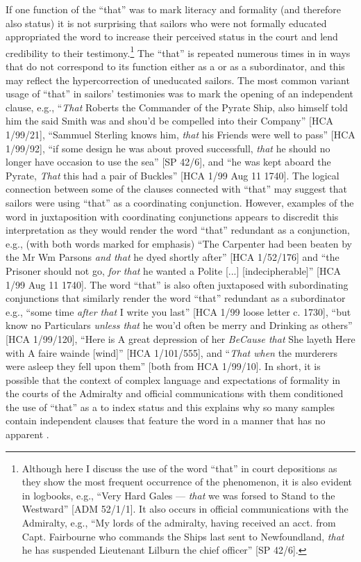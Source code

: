 If one function of the  “that” was to mark literacy and formality (and therefore also status) it is not surprising that sailors who were not formally educated appropriated the word to increase their perceived status in the court and lend credibility to their testimony.\footnote{Although here I discuss the use of the word “that” in court depositions as they show the most frequent occurrence of the phenomenon, it is also evident in logbooks, e.g., “Very Hard Gales — \textit{that} we was forsed to Stand to the Westward” [ADM 52/1/1]. It also occurs in official communications with the Admiralty, e.g., “My lords of the admiralty, having received an acct. from Capt. Fairbourne who commands the Ships last sent to Newfoundland, \textit{that} he has suspended Lieutenant Lilburn the chief officer” [SP 42/6].}   The  “that” is repeated numerous times in  in ways that do not correspond to its function either as a  or as a subordinator, and this may reflect the hypercorrection of uneducated sailors. The most common variant usage of “that” in sailors’ testimonies was to mark the opening of an independent clause, e.g., “\textit{That} Roberts the Commander of the Pyrate Ship, also himself told him the said Smith was and shou’d be compelled into their Company” [HCA 1/99/21], “Sammuel Sterling knows him, \textit{that} his Friends were well to pass” [HCA 1/99/92], “if some design he was about proved successfull, \textit{that} he should no longer have occasion to use the sea” [SP 42/6], and “he was kept aboard the Pyrate, \textit{That} this  had a pair of Buckles” [HCA 1/99  Aug 11 1740]. The logical connection between some of the clauses connected with “that” may suggest that sailors were using “that” as a coordinating conjunction. However, examples of the word in juxtaposition with coordinating conjunctions appears to discredit this interpretation as they would render the word “that” redundant as a conjunction, e.g., (with both words marked for emphasis) “The Carpenter had been beaten by the Mr Wm Parsons \textit{and that} he dyed shortly after” [HCA 1/52/176] and “the Prisoner should not go, \textit{for that} he wanted a Polite [...] [indecipherable]” [HCA 1/99  Aug 11 1740]. The word “that” is also often juxtaposed with subordinating conjunctions that similarly render the word “that” redundant as a subordinator e.g., “some time \textit{after that} I write you last” [HCA 1/99 loose letter c. 1730], “but know no Particulars \textit{unless that} he wou’d often be merry and Drinking as others” [HCA 1/99/120], “Here is A great depression of her \textit{BeCause that} She layeth Here with A faire wainde [wind]” [HCA 1/101/555], and “\textit{That when} the murderers were asleep they fell upon them” [both from HCA 1/99/10]. In short, it is possible that the context of complex language and expectations of formality in the courts of the Admiralty and official communications with them conditioned the use of “that” as a  to index status and this explains why so many samples contain independent clauses that feature the word in a manner that has no apparent .

